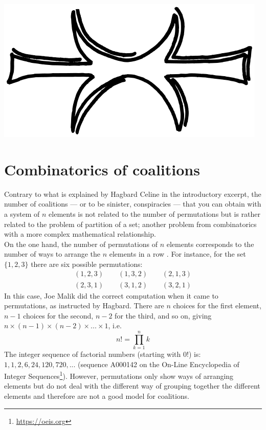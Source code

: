 \begin{center}
\includegraphics[scale=0.1]{./img/eris.png}
\end{center}

\section*{Combinatorics of coalitions}
Contrary to what is explained by Hagbard Celine in the introductory excerpt, the number of coalitions --- or to be sinister, conspiracies --- that you can obtain with a system of $n$ elements is not related to the number of permutations but is rather related to the problem of partition of a set; another problem from combinatorics with a more complex mathematical relationship.\\

On the one hand, the number of permutations of $n$ elements corresponds to the number of ways to arrange the $n$ elements in a row \cite{Graham1988}. For instance, for the set $\{1,2,3\}$ there are six possible permutations:
\begin{gather*}
(1,2,3) \qquad (1,3,2) \qquad (2,1,3) \\ 
(2,3,1) \qquad (3,1,2) \qquad (3,2,1)
\end{gather*}
In this case, Joe Malik did the correct computation when it came to permutations, as instructed by Hagbard. There are $n$ choices for the first element, $n-1$ choices for the second, $n-2$ for the third, and so on, giving $n\times(n-1)\times(n-2)\times...\times1$, i.e.
\begin{equation}
n! = \prod\limits_{k = 1}^n k
\end{equation}
The integer sequence of factorial numbers (starting with $0!$) is: $1, 1, 2, 6, 24, 120, 720, ...$ (sequence A000142 on the On-Line Encyclopedia of Integer Sequences\footnote{\url{https://oeis.org}}).
However, permutations only show ways of arranging elements but do not deal with the different way of grouping together the different elements and therefore are not a good model for coalitions.\\

